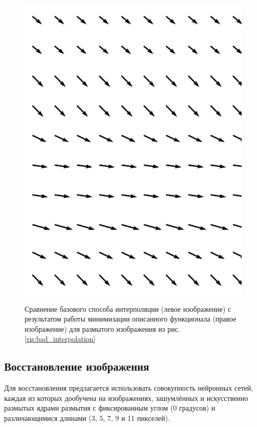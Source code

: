 \begin{figure} [H]
\begin{minipage}[w]{0.28\linewidth}
\includegraphics[width=1\linewidth, left]{pics/fields/method.png} \\ 
\end{minipage}
\caption{Сравнение базового способа интерполяции (левое изображение) с результатом работы минимизации описанного функционала (правое изображение) для размытого изображения из рис. \ref{ris:bad_interpolation} }
\label{ris:good_interpolation}
\end{figure}


\newpage
\subsection{Восстановление изображения}
Для восстановления предлагается использовать совокупность нейронных сетей, каждая из которых дообучена на изображениях, зашумлённых и искусственно размытых ядрами размытия с фиксированным углом (0 градусов)
и различающимися длинами (3, 5, 7, 9 и 11 пикселей).

